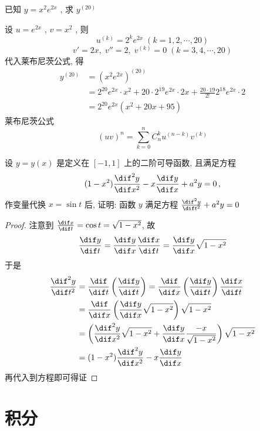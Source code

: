 \documentclass[color=green,titlestyle=hang]{elegantbook}%
\begin{document}
\begin{exercise}  已知 $\displaystyle y=x^2e^{2x}$ , 求 $\displaystyle y^{(20)}$\\[-3mm]
\end{exercise}\begin{Solution}设 $\displaystyle u=e^{2x}$ , $\displaystyle v=x^2$ ,  则
\begin{equation*}u^{(k)}=2^ke^{2x}\;(k=1,2,\cdots,20)\end{equation*}
\begin{equation*}v'=2x,\;v''=2,\;v^{(k)}=0\;(k=3,4,\cdots,20)\end{equation*}
代入莱布尼茨公式, 得\begin{align*}y^{(20)}&=(x^2e^{2x})^{(20)}\\
&=2^{20}e^{2x}\cdot x^2+20\cdot2^{19}e^{2x}\cdot2x+\frac{20\cdot19}{2!}2^{18}e^{2x}\cdot2\\
&=2^{20}e^{2x}(x^2+20x+95)
\end{align*}
莱布尼茨公式\begin{equation*}(uv)^{n}=\sum_{k=0}^{n}C_n^ku^{(n-k)}v^{(k)}\end{equation*}	
\end{Solution}

\begin{example}
设 $y=y(x)$ 是定义在 $[-1,1]$ 上的二阶可导函数, 且满足方程
\[(1-x^2)\frac{\dif^2y}{\dif x^2}-x\frac{\dif y}{\dif x}+a^2y=0\,,\]
作变量代换 $x=\sin t$ 后, 证明: 函数 $y$ 满足方程 $\frac{\dif^2y}{\dif t^2}+a^2y=0$
\end{example}\begin{proof}
注意到 $\frac{\dif x}{\dif t}=\cos t=\sqrt{1-x^2}$, 故
\[\frac{\dif y}{\dif t}=\frac{\dif y}{\dif x}\frac{\dif x}{\dif t}=\frac{\dif y}{\dif x}\sqrt{1-x^2}\]
于是\begin{align*}
\frac{\dif^2y}{\dif t^2}&=\frac{\dif}{\dif t}\left(\frac{\dif y}{\dif t}\right)=\frac{\dif}{\dif x}\left(\frac{\dif y}{\dif t}\right)\frac{\dif x}{\dif t}\\
&=\frac{\dif}{\dif x}\left(\frac{\dif y}{\dif x}\sqrt{1-x^2}\right)\sqrt{1-x^2}\\
&=\left(\frac{\dif^2y}{\dif x^2}\sqrt{1-x^2}+\frac{\dif y}{\dif x}\frac{-x}{\sqrt{1-x^2}}\right)\sqrt{1-x^2}\\
&=(1-x^2)\frac{\dif^2y}{\dif x^2}-x\frac{\dif y}{\dif x}
\end{align*}
再代入到方程即可得证
\end{proof}

\chapter{积分}
\end{document}
